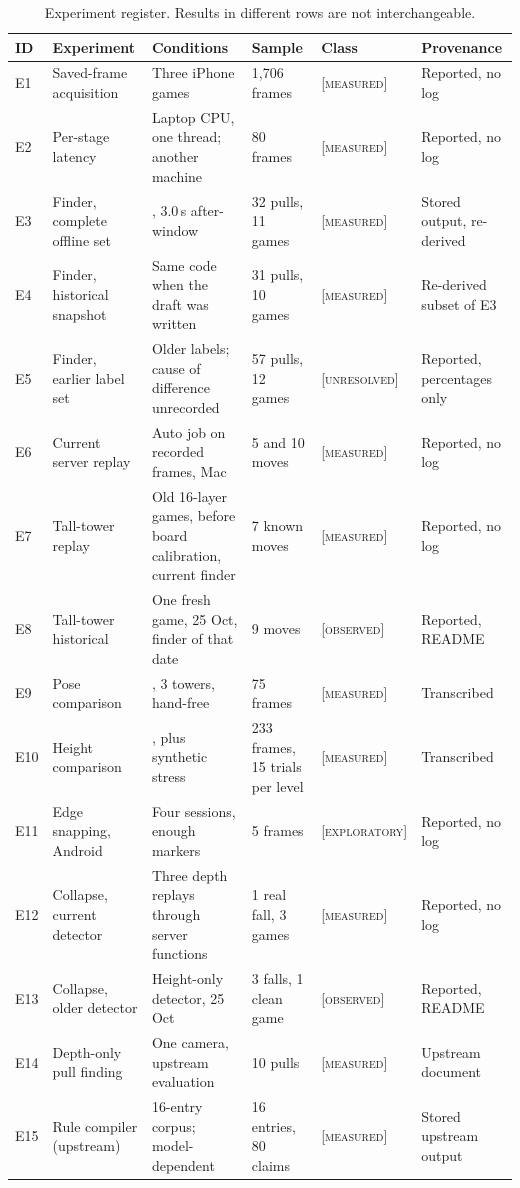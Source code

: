 \documentclass[conference,10pt]{IEEEtran}
\newcommand{\code}[1]{\texttt{\small\detokenize{#1}}}
\newcommand{\evM}{\textsc{[measured]}}
\newcommand{\evO}{\textsc{[observed]}}
\newcommand{\evE}{\textsc{[exploratory]}}
\newcommand{\evU}{\textsc{[unresolved]}}
\begin{document}
\begin{table}[!t]
\caption{Experiment register. Results in different rows are not interchangeable.}\label{tab:experiments}
\centering\footnotesize
\begin{tabular}{@{}p{0.45cm}p{3.75cm}p{5.0cm}p{2.3cm}p{2.0cm}p{2.5cm}@{}}
\toprule
ID & Experiment & Conditions & Sample & Class & Provenance \\
\midrule
E1 & Saved-frame acquisition & Three iPhone games & 1{,}706 frames & \evM & Reported, no log \\
E2 & Per-stage latency & Laptop CPU, one thread; another machine & 80 frames & \evM & Reported, no log \\
E3 & Finder, complete offline set & \code{eval_variants.py}, 3.0\,s after-window & 32 pulls, 11 games & \evM & Stored output, re-derived \\
E4 & Finder, historical snapshot & Same code when the draft was written & 31 pulls, 10 games & \evM & Re-derived subset of E3 \\
E5 & Finder, earlier label set & Older labels; cause of difference unrecorded & 57 pulls, 12 games & \evU & Reported, percentages only \\
E6 & Current server replay & Auto job on recorded frames, Mac & 5 and 10 moves & \evM & Reported, no log \\
E7 & Tall-tower replay & Old 16-layer games, before board calibration, current finder & 7 known moves & \evM & Reported, no log \\
E8 & Tall-tower historical & One fresh game, 25 Oct, finder of that date & 9 moves & \evO & Reported, README \\
E9 & Pose comparison & \code{benchmark_pose.py}, 3 towers, hand-free & 75 frames & \evM & Transcribed \\
E10 & Height comparison & \code{benchmark_height.py}, plus synthetic stress & 233 frames, 15 trials per level & \evM & Transcribed \\
E11 & Edge snapping, Android & Four sessions, enough markers & 5 frames & \evE & Reported, no log \\
E12 & Collapse, current detector & Three depth replays through server functions & 1 real fall, 3 games & \evM & Reported, no log \\
E13 & Collapse, older detector & Height-only detector, 25 Oct & 3 falls, 1 clean game & \evO & Reported, README \\
E14 & Depth-only pull finding & One camera, upstream evaluation & 10 pulls & \evM & Upstream document \\
E15 & Rule compiler (upstream) & 16-entry corpus; model-dependent & 16 entries, 80 claims & \evM & Stored upstream output \\
\bottomrule
\end{tabular}
\end{table}
\end{document}

